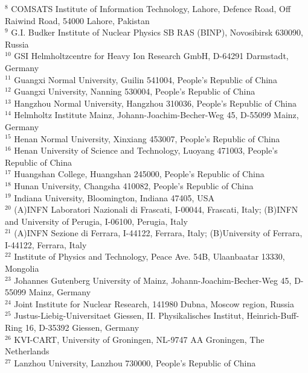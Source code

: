 \documentclass[aps,prd,twocolumn,showpacs,floatfix,byrevtex]{revtex4-1}
\begin{document}
{{$^{8}$ COMSATS Institute of Information Technology, Lahore, Defence Road, Off Raiwind Road, 54000 Lahore, Pakistan\\
$^{9}$ G.I. Budker Institute of Nuclear Physics SB RAS (BINP), Novosibirsk 630090, Russia\\
$^{10}$ GSI Helmholtzcentre for Heavy Ion Research GmbH, D-64291 Darmstadt, Germany\\
$^{11}$ Guangxi Normal University, Guilin 541004, People's Republic of China\\
$^{12}$ Guangxi University, Nanning 530004, People's Republic of China\\
$^{13}$ Hangzhou Normal University, Hangzhou 310036, People's Republic of China\\
$^{14}$ Helmholtz Institute Mainz, Johann-Joachim-Becher-Weg 45, D-55099 Mainz, Germany\\
$^{15}$ Henan Normal University, Xinxiang 453007, People's Republic of China\\
$^{16}$ Henan University of Science and Technology, Luoyang 471003, People's Republic of China\\
$^{17}$ Huangshan College, Huangshan 245000, People's Republic of China\\
$^{18}$ Hunan University, Changsha 410082, People's Republic of China\\
$^{19}$ Indiana University, Bloomington, Indiana 47405, USA\\
$^{20}$ (A)INFN Laboratori Nazionali di Frascati, I-00044, Frascati, Italy; (B)INFN and University of Perugia, I-06100, Perugia, Italy\\
$^{21}$ (A)INFN Sezione di Ferrara, I-44122, Ferrara, Italy; (B)University of Ferrara, I-44122, Ferrara, Italy\\
$^{22}$ Institute of Physics and Technology, Peace Ave. 54B, Ulaanbaatar 13330, Mongolia\\
$^{23}$ Johannes Gutenberg University of Mainz, Johann-Joachim-Becher-Weg 45, D-55099 Mainz, Germany\\
$^{24}$ Joint Institute for Nuclear Research, 141980 Dubna, Moscow region, Russia\\
$^{25}$ Justus-Liebig-Universitaet Giessen, II. Physikalisches Institut, Heinrich-Buff-Ring 16, D-35392 Giessen, Germany\\
$^{26}$ KVI-CART, University of Groningen, NL-9747 AA Groningen, The Netherlands\\
$^{27}$ Lanzhou University, Lanzhou 730000, People's Republic of China\\
}}
\end{document}
